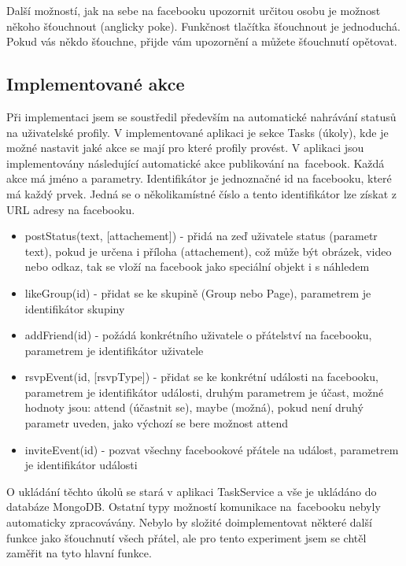 \documentclass[thesis=M,czech]{FITthesis}[2013/05/10]
\begin{document}
Další možností, jak na sebe na facebooku upozornit určitou osobu je možnost někoho šťouchnout (anglicky poke). Funkčnost tlačítka šťouchnout je jednoduchá. Pokud vás někdo šťouchne, přijde vám upozornění a můžete šťouchnutí opětovat.

\subsection{Implementované akce}

Při implementaci jsem se soustředil především na automatické nahrávání statusů na uživatelské profily. V implementované aplikaci je sekce Tasks (úkoly), kde je možné nastavit jaké akce se mají pro které profily provést. V aplikaci jsou implementovány následující automatické akce publikování na~facebook. Každá akce má jméno a parametry. Identifikátor je jednoznačné id na facebooku, které má každý prvek. Jedná se o několikamístné číslo a tento identifikátor lze získat z URL adresy na facebooku.

\begin{itemize}
  \item postStatus(text, [attachement]) - přidá na zeď uživatele status (parametr text), pokud je určena i příloha (attachement), což může být obrázek, video nebo odkaz, tak se vloží na facebook jako speciální objekt i s náhledem
  \item likeGroup(id) - přidat se ke skupině (Group nebo Page), parametrem je identifikátor skupiny 
  \item addFriend(id) - požádá konkrétního uživatele o přátelství na facebooku, parametrem je identifikátor uživatele
  \item rsvpEvent(id, [rsvpType]) - přidat se ke konkrétní události na facebooku, parametrem je identifikátor události, druhým parametrem je účast, možné hodnoty jsou: attend (účastnit se), maybe (možná), pokud není druhý parametr uveden, jako výchozí se bere možnost attend
  \item inviteEvent(id) - pozvat všechny facebookové přátele na událost, parametrem je identifikátor události
\end{itemize}

O ukládání těchto úkolů se stará v aplikaci TaskService a vše je ukládáno do databáze MongoDB. Ostatní typy možností komunikace na~facebooku nebyly automaticky zpracovávány. Nebylo by složité doimplementovat některé další funkce jako šťouchnutí všech přátel, ale pro tento experiment jsem se chtěl zaměřit na tyto hlavní funkce. 
\end{document}
